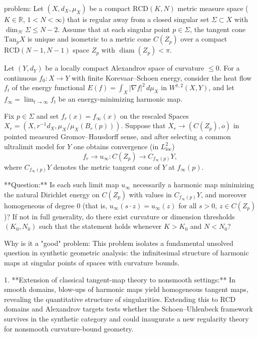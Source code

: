 problem:  
Let \((X,d_X,\mu_X)\) be a compact \(\mathrm{RCD}(K,N)\) metric measure space (\(K \in \mathbb{R}\), \(1<N<\infty\)) that is regular away from a closed singular set \(\Sigma \subset X\) with \(\dim_{\mathcal{H}} \Sigma \le N-2\).  
Assume that at each singular point \(p\in \Sigma\), the tangent cone \(\mathrm{Tan}_p X\) is unique and isometric to a metric cone \(C(Z_p)\) over a compact \(\mathrm{RCD}(N-1,N-1)\) space \(Z_p\) with \(\operatorname{diam}(Z_p)<\pi\).  

Let \((Y,d_Y)\) be a locally compact Alexandrov space of curvature \(\le 0\).  
For a continuous \(f_0:X\to Y\) with finite Korevaar–Schoen energy, consider the heat flow \(f_t\) of the energy functional \(E(f)=\int_X |\nabla f|^2\,d\mu_X\) in \(W^{1,2}(X,Y)\), and let \(f_\infty=\lim_{t\to\infty} f_t\) be an energy-minimizing harmonic map.  

Fix \(p\in \Sigma\) and set \(f_r(x)=f_\infty(x)\) on the rescaled Spaces \(X_r=(X, r^{-1}d_X, \mu_X/\mu_X(B_r(p)))\).  
Suppose that \(X_r \to (C(Z_p),o)\) in pointed measured Gromov–Hausdorff sense, and after selecting a common ultralimit model for \(Y\) one obtains convergence (in \(L^2_{\text{loc}}\))  
\[
f_r \to u_\infty : C(Z_p) \to C_{f_\infty(p)}Y,
\]
where \(C_{f_\infty(p)}Y\) denotes the metric tangent cone of \(Y\) at \(f_\infty(p)\).  

**Question:**  
Is each such limit map \(u_\infty\) necessarily a harmonic map minimizing the natural Dirichlet energy on \(C(Z_p)\) with values in \(C_{f_\infty(p)}Y\), and moreover homogeneous of degree \(0\) (that is, \(u_\infty(s\cdot z)=u_\infty(z)\) for all \(s>0\), \(z\in C(Z_p)\))?  
If not in full generality, do there exist curvature or dimension thresholds \((K_0,N_0)\) such that the statement holds whenever \(K>K_0\) and \(N<N_0\)?  

Why is it a "good" problem:  
This problem isolates a fundamental unsolved question in synthetic geometric analysis: the infinitesimal structure of harmonic maps at singular points of spaces with curvature bounds.  

1. **Extension of classical tangent-map theory to nonsmooth settings:**  
   In smooth domains, blow-ups of harmonic maps yield homogeneous tangent maps, revealing the quantitative structure of singularities. Extending this to RCD domains and Alexandrov targets tests whether the Schoen–Uhlenbeck framework survives in the synthetic category and could inaugurate a new regularity theory for nonsmooth curvature-bound geometry.  

